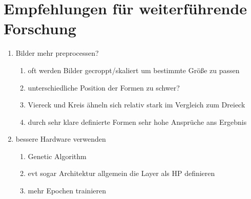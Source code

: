 \section{Empfehlungen für weiterführende Forschung}
\begin{enumerate}
	\item Bilder mehr preprocessen?
	\begin{enumerate}
		\item oft werden Bilder gecroppt/skaliert um bestimmte Größe zu passen
		\item unterschiedliche Position der Formen zu schwer?
		\item Viereck und Kreis ähneln sich relativ stark im Vergleich zum Dreieck
		\item durch sehr klare definierte Formen sehr hohe Ansprüche ans Ergebnis
	\end{enumerate}

	\item bessere Hardware verwenden
	\begin{enumerate}
		\item Genetic Algorithm
		\item evt sogar Architektur allgemein die Layer als HP definieren
		\item mehr Epochen trainieren
	\end{enumerate}
\end{enumerate}